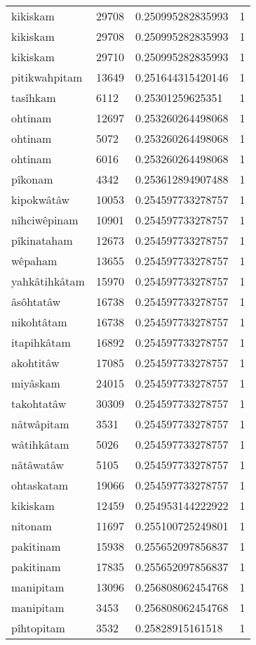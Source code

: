 \begin{longtable}{llll}
kikiskam & 29708 & 0.250995282835993 & 1 \\
kikiskam & 29708 & 0.250995282835993 & 1 \\
kikiskam & 29710 & 0.250995282835993 & 1 \\
pitikwahpitam & 13649 & 0.251644315420146 & 1 \\
tasîhkam & 6112 & 0.25301259625351 & 1 \\
ohtinam & 12697 & 0.253260264498068 & 1 \\
ohtinam & 5072 & 0.253260264498068 & 1 \\
ohtinam & 6016 & 0.253260264498068 & 1 \\
pîkonam & 4342 & 0.253612894907488 & 1 \\
kipokwâtâw & 10053 & 0.254597733278757 & 1 \\
nîhciwêpinam & 10901 & 0.254597733278757 & 1 \\
pîkinataham & 12673 & 0.254597733278757 & 1 \\
wêpaham & 13655 & 0.254597733278757 & 1 \\
yahkâtihkâtam & 15970 & 0.254597733278757 & 1 \\
âsôhtatâw & 16738 & 0.254597733278757 & 1 \\
nikohtâtam & 16738 & 0.254597733278757 & 1 \\
itapihkâtam & 16892 & 0.254597733278757 & 1 \\
akohtitâw & 17085 & 0.254597733278757 & 1 \\
miyâskam & 24015 & 0.254597733278757 & 1 \\
takohtatâw & 30309 & 0.254597733278757 & 1 \\
nâtwâpitam & 3531 & 0.254597733278757 & 1 \\
wâtihkâtam & 5026 & 0.254597733278757 & 1 \\
nâtâwatâw & 5105 & 0.254597733278757 & 1 \\
ohtaskatam & 19066 & 0.254597733278757 & 1 \\
kikiskam & 12459 & 0.254953144222922 & 1 \\
nitonam & 11697 & 0.255100725249801 & 1 \\
pakitinam & 15938 & 0.255652097856837 & 1 \\
pakitinam & 17835 & 0.255652097856837 & 1 \\
manipitam & 13096 & 0.256808062454768 & 1 \\
manipitam & 3453 & 0.256808062454768 & 1 \\
pîhtopitam & 3532 & 0.25828915161518 & 1 \\

\end{longtable}
